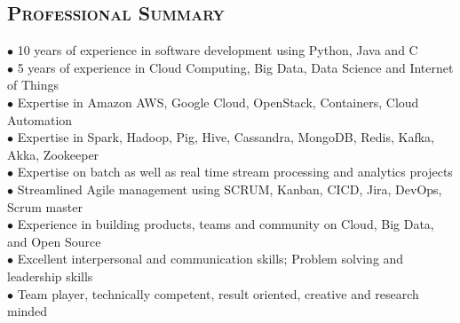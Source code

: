 \begin{resume}


\section{\textsc{Professional Summary}}
$\bullet$ 10 years of experience in software development using Python, Java and C\\
$\bullet$ 5 years of experience in Cloud Computing, Big Data, Data Science and Internet of Things\\
$\bullet$ Expertise in Amazon AWS, Google Cloud, OpenStack, Containers, Cloud Automation\\
$\bullet$ Expertise in Spark, Hadoop, Pig, Hive, Cassandra, MongoDB, Redis, Kafka, Akka, Zookeeper\\
$\bullet$ Expertise on batch as well as real time stream processing and analytics projects\\
$\bullet$ Streamlined Agile management using SCRUM, Kanban, CICD, Jira, DevOps, Scrum master\\
$\bullet$ Experience in building products, teams and community on Cloud, Big Data, and Open Source\\
$\bullet$ Excellent interpersonal and communication skills; Problem solving and leadership skills\\
$\bullet$ Team player, technically competent, result oriented, creative and research minded


\end{resume}
